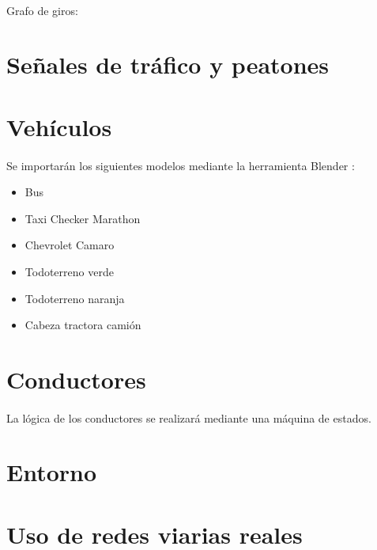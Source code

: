 	\paragraph{}	
	Grafo de giros:
	\tiny
	
	\normalsize
	
\section{Señales de tráfico y peatones}

	\paragraph{}
	

\section{Vehículos}
	
	\paragraph{}
	Se importarán los siguientes modelos mediante la herramienta Blender \cite{Blender_web}:
	\begin{itemize}
		\item Bus
		\item Taxi Checker Marathon
		\item Chevrolet Camaro
		\item Todoterreno verde
		\item Todoterreno naranja
		\item Cabeza tractora camión
	\end{itemize}
	
\section{Conductores}

	\paragraph{}
	La lógica de los conductores se realizará mediante una máquina de estados.
	
\section{Entorno}

	\paragraph{}
	
\section{Uso de redes viarias reales}

	\paragraph{}
	